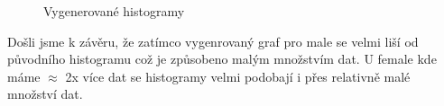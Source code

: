 \documentclass[paper=a4, fontsize=12pt]{scrartcl}
\numberwithin{equation}{section}		%
\numberwithin{figure}{section}			%
\numberwithin{table}{section}				%
\begin{document}
\begin{figure}[H]
  \centering
  \qquad
  \caption{Vygenerované histogramy}
\end{figure}
Došli jsme k závěru, že zatímco vygenrovaný graf pro male se velmi liší od původního
histogramu což je způsobeno malým množstvím dat. U female kde máme $\approx$ 2x více dat se histogramy
velmi podobají i přes relativně malé množství dat.
\end{document}
